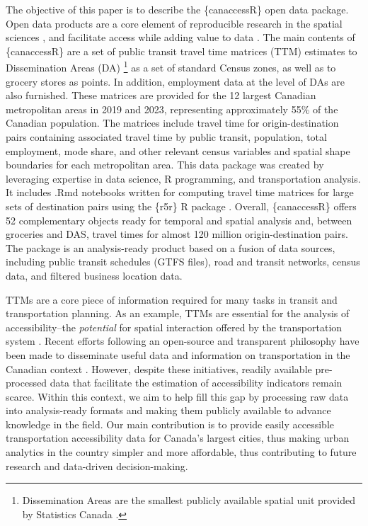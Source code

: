 \documentclass[Royal,times,sageh]{sagej}
\begin{document}
The objective of this paper is to describe the \{canaccessR\} open data
package. Open data products are a core element of reproducible research
in the spatial sciences \citep{paez_open_2021}, and facilitate access
while adding value to data \citep{arribas-bel2021}. The main contents of
\{canaccessR\} are a set of public transit travel time matrices (TTM)
estimates to Dissemination Areas (DA) \footnote{Dissemination Areas are
  the smallest publicly available spatial unit provided by Statistics
  Canada \citep{governmentofcanadaDictionaryCensusPopulation2021a}.} as
a set of standard Census zones, as well as to grocery stores as points.
In addition, employment data at the level of DAs are also furnished.
These matrices are provided for the 12 largest Canadian metropolitan
areas in 2019 and 2023, representing approximately 55\% of the Canadian
population. The matrices include travel time for origin-destination
pairs containing associated travel time by public transit, population,
total employment, mode share, and other relevant census variables and
spatial shape boundaries for each metropolitan area. This data package
was created by leveraging expertise in data science, R programming, and
transportation analysis. It includes .Rmd notebooks written for
computing travel time matrices for large sets of destination pairs using
the \{r5r\} R package \citep{pereiraR5rRapidRealistic2021}. Overall,
\{canaccessR\} offers 52 complementary objects ready for temporal and
spatial analysis and, between groceries and DAS, travel times for almost
120 million origin-destination pairs. The package is an analysis-ready
product based on a fusion of data sources, including public transit
schedules (GTFS files), road and transit networks, census data, and
filtered business location data.

TTMs are a core piece of information required for many tasks in transit
and transportation planning. As an example, TTMs are essential for the
analysis of accessibility--the \emph{potential} for spatial interaction
offered by the transportation system
\citep{paezMeasuringAccessibilityPositive2012}. Recent efforts following
an open-source and transparent philosophy have been made to disseminate
useful data and information on transportation in the Canadian context
\citep{soukhovTTS2016RDataSet2023}. However, despite these initiatives,
readily available pre-processed data that facilitate the estimation of
accessibility indicators remain scarce. Within this context, we aim to
help fill this gap by processing raw data into analysis-ready formats
and making them publicly available to advance knowledge in the field.
Our main contribution is to provide easily accessible transportation
accessibility data for Canada's largest cities, thus making urban
analytics in the country simpler and more affordable, thus contributing
to future research and data-driven decision-making.
\end{document}
